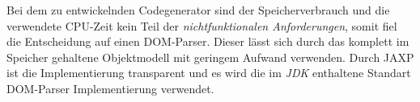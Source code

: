 Bei dem zu entwickelnden Codegenerator sind der Speicherverbrauch und die verwendete CPU-Zeit kein Teil der \emph{nichtfunktionalen Anforderungen}, somit fiel die Entscheidung auf einen DOM-Parser. Dieser lässt sich durch das komplett im Speicher gehaltene Objektmodell mit geringem Aufwand verwenden. Durch JAXP ist die Implementierung transparent und es wird die im \emph{JDK} enthaltene Standart DOM-Parser Implementierung verwendet.

